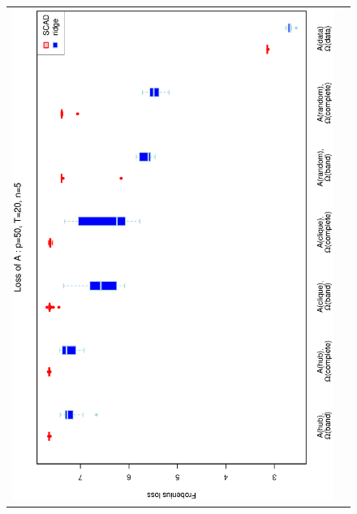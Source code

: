\documentclass[a4paper]{article}
\begin{document}
\begin{figure}[h!]
\centering
\begin{tabular}{cc}
\includegraphics[scale=0.45,angle=270]{LossA50T20N5_25.eps}
\\

\end{tabular}
\end{figure}
\end{document}
